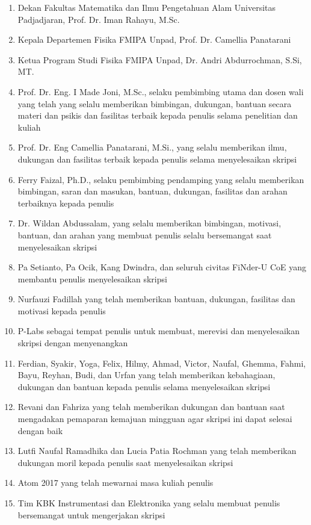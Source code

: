 \documentclass[12pt,a4paper]{report}
\begin{document}
\begin{enumerate}
	\item Dekan Fakultas Matematika dan Ilmu Pengetahuan Alam Universitas Padjadjaran, Prof. Dr. Iman Rahayu, M.Sc.
	\item Kepala Departemen Fisika FMIPA Unpad, Prof. Dr. Camellia Panatarani
	\item Ketua Program Studi Fisika FMIPA Unpad, Dr. Andri Abdurrochman, S.Si, MT.
	\item Prof. Dr. Eng. I Made Joni, M.Sc., selaku pembimbing utama dan dosen wali yang telah yang selalu memberikan bimbingan, dukungan, bantuan secara materi dan psikis dan fasilitas terbaik kepada penulis selama penelitian dan kuliah
	\item Prof. Dr. Eng Camellia Panatarani, M.Si., yang selalu memberikan ilmu, dukungan dan fasilitas terbaik kepada penulis selama menyelesaikan skripsi
	\item Ferry Faizal, Ph.D., selaku pembimbing pendamping yang selalu memberikan bimbingan, saran dan masukan, bantuan, dukungan, fasilitas dan arahan terbaiknya kepada penulis
	\item Dr. Wildan Abdussalam, yang selalu memberikan bimbingan, motivasi, bantuan, dan arahan yang membuat penulis selalu bersemangat saat menyelesaikan skripsi
	\item Pa Setianto, Pa Ocik, Kang Dwindra, dan seluruh civitas FiNder-U CoE yang membantu penulis menyelesaikan skripsi
	\item Nurfauzi Fadillah yang telah memberikan bantuan, dukungan, fasilitas dan motivasi kepada penulis
	\item P-Labs sebagai tempat penulis untuk membuat, merevisi dan menyelesaikan skripsi dengan menyenangkan
	\item Ferdian, Syakir, Yoga, Felix, Hilmy, Ahmad, Victor, Naufal, Ghemma, Fahmi, Bayu, Reyhan, Budi, dan Urfan yang telah memberikan kebahagiaan, dukungan dan bantuan kepada penulis selama menyelesaikan skripsi
	\item Revani dan Fahriza yang telah memberikan dukungan dan bantuan saat mengadakan pemaparan kemajuan mingguan agar skripsi ini dapat selesai dengan baik
	\item Lutfi Naufal Ramadhika dan Lucia Patia Rochman yang telah memberikan dukungan moril kepada penulis saat menyelesaikan skripsi
	\item Atom 2017 yang telah mewarnai masa kuliah penulis
	\item Tim KBK Instrumentasi dan Elektronika yang selalu membuat penulis bersemangat untuk mengerjakan skripsi
\end{enumerate}
\end{document}
